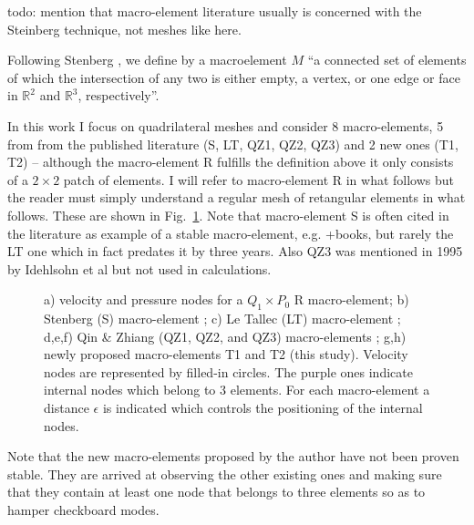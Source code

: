 \documentclass[a4paper,12pt]{article}
\begin{document}
{\color{red} todo: mention that macro-element literature usually is concerned with 
the Steinberg technique, not meshes like here.}



Following Stenberg \cite{sten90}, we define by a macroelement $M$ ``a connected set of elements of which the 
intersection of any two is either empty, a vertex, or one edge or face in $\mathbb{R}^2$ 
and $\mathbb{R}^3$, respectively''.

In this work I focus on quadrilateral meshes and consider 8 
macro-elements, 5 from from the published literature (S, LT, QZ1, QZ2, QZ3) and 2 new ones (T1, T2) -- although 
the macro-element R fulfills the definition above it only consists of a $2\times 2$ patch of elements.
I will refer to macro-element R in what follows but the reader must simply understand a regular 
mesh of retangular elements in what follows.
These are shown in Fig.~\ref{fig:mes}.
Note that macro-element S is often cited in the literature as example of a stable macro-element, 
e.g. \cite{chba93}+books\cite{elsw}, but rarely the LT one which in fact predates it by three years. 
Also QZ3 was mentioned in 1995 by Idehlsohn et al \cite{idsn95} but not used in calculations. 

\begin{figure}[t]
\centering

\caption{
a) velocity and pressure nodes for a $Q_1\times P_0$ R macro-element;
b) Stenberg (S) macro-element \cite{sten84}; 
c) Le Tallec (LT) macro-element \cite{leta81,leru86}; 
d,e,f) Qin \& Zhiang (QZ1, QZ2, and QZ3) macro-elements \cite{qizh07}; 
g,h) newly proposed macro-elements T1 and T2 (this study).
Velocity nodes are represented by filled-in circles. The purple ones indicate internal nodes which belong to 3 elements.
For each macro-element a distance $\epsilon$ is indicated which controls the positioning of the internal nodes.
\label{fig:mes}}
\end{figure}

Note that the new macro-elements proposed by the author have not been proven stable. They are arrived at 
observing the other existing ones and making sure that they contain at least one node that belongs to three 
elements so as to hamper checkboard modes.

\end{document}
